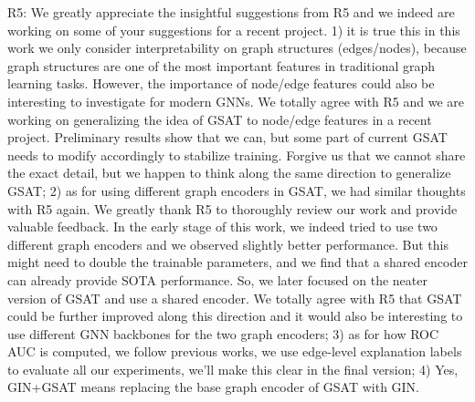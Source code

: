 \documentclass{article}
\begin{document}
R5: We greatly appreciate the insightful suggestions from R5 and we indeed are working on some of your suggestions for a recent project. 1) it is true this in this work we only consider interpretability on graph structures (edges/nodes), because graph structures are one of the most important features in traditional graph learning tasks. However, the importance of node/edge features could also be interesting to investigate for modern GNNs. We totally agree with R5 and we are working on generalizing the idea of GSAT to node/edge features in a recent project. Preliminary results show that we can, but some part of current GSAT needs to modify accordingly to stabilize training. Forgive us that we cannot share the exact detail, but we happen to think along the same direction to generalize GSAT; 2) as for using different graph encoders in GSAT, we had similar thoughts with R5 again. We greatly thank R5 to thoroughly review our work and provide valuable feedback. In the early stage of this work, we indeed tried to use two different graph encoders and we observed slightly better performance. But this might need to double the trainable parameters, and we find that a shared encoder can already provide SOTA performance. So, we later focused on the neater version of GSAT and use a shared encoder. We totally agree with R5 that GSAT could be further improved along this direction and it would also be interesting to use different GNN backbones for the two graph encoders; 3) as for how ROC AUC is computed, we follow previous works, we use edge-level explanation labels to evaluate all our experiments, we'll make this clear in the final version; 4) Yes, GIN+GSAT means replacing the base graph encoder of GSAT with GIN.
\end{document}
